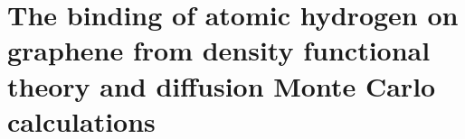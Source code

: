 \chapter{The binding of atomic hydrogen on graphene from density functional theory and diffusion Monte Carlo calculations}



%



